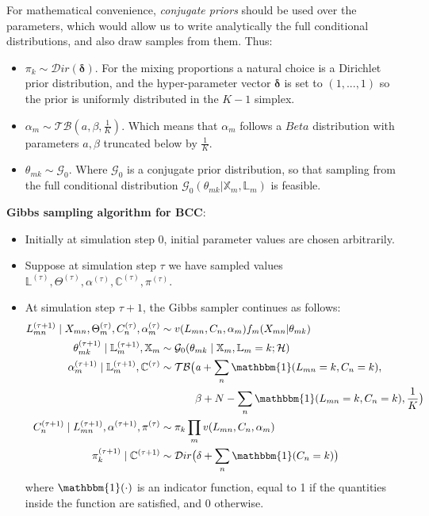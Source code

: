 For mathematical convenience, \emph{conjugate priors} should be used over the parameters, which would allow us to write analytically the full conditional distributions, and also draw samples from them. Thus:
\begin{itemize}
	\item $\pi_{k} \sim \mathcal{D}ir(\mathbf{\delta})$. For the mixing proportions a natural choice is a Dirichlet prior distribution, and the hyper-parameter vector $\mathbf{\delta}$ is set to $(1,...,1)$ so the prior is uniformly distributed in the $K-1$ simplex.
	\item $\alpha_{m} \sim \mathcal{TB}(\mathit{a}, \beta, \frac{1}{K})$. Which means that $\alpha_{m}$ follows a $Beta$ distribution with parameters $\mathit{a}, \beta$ truncated below by $\frac{1}{K}$.
	\item $\theta_{mk} \sim \mathcal{G}_{0}$. Where $\mathcal{G}_{0}$ is a conjugate prior distribution, so that sampling from the full conditional distribution $\mathcal{G}_{0}(\theta_{mk}|\mathbb{X}_{m}, \mathbb{L}_{m})$ is feasible.
\end{itemize}

\noindent\textbf{Gibbs sampling algorithm for BCC}: 
\begin{itemize}
\item {Initially at simulation step 0, initial parameter values are chosen arbitrarily.}
\item {Suppose at simulation step $\tau$ we have sampled values $\mathbb{L}^{(\tau)}, \Theta^{(\tau)}, \alpha^{(\tau)}, \mathbb{C}^{(\tau)}, \pi^{(\tau)}$.}
\item { At simulation step $\tau + 1$, the Gibbs sampler continues as follows:
\begin{equation*}%
  \begin{aligned}
    L_{mn}^{(\tau+1)} \mid X_{mn}, \Theta_{m}^{(\tau)}, C_{n}^{(\tau)}, \alpha_{m}^{(\tau)} & \sim v(L_{mn}, C_{n}, \alpha_{m}) f_{m}(X_{mn}|\theta_{mk}) \\
	\theta_{mk}^{(\tau+1)} \mid \mathbb{L}_{m}^{(\tau+1)}, \mathbb{X}_{m} & \sim \mathcal{G}_{0}(\theta_{mk} \mid \mathbb{X}_{m}, \mathbb{L}_{m} = k; \mathcal{H}) \\
	\alpha_{m}^{(\tau+1)} \mid \mathbb{L}_{m}^{(\tau+1)}, \mathbb{C}^{(\tau)} & \sim \mathcal{TB} \big(\mathit{a}+\sum_{n}\mathbbm{1}(L_{mn}=k,C_{n}=k), \\
	  & \quad \quad \quad \; \beta + N -\sum_{n}\mathbbm{1}(L_{mn}=k,C_{n}=k), \frac{1}{K}\big) \\
	C_{n}^{(\tau+1)} \mid L_{mn}^{(\tau+1)}, \alpha^{(\tau+1)}, \pi^{(\tau)} & \sim \pi_{k} \prod_{m}v(L_{mn}, C_{n}, \alpha_{m}) \\
	\pi_{k}^{(\tau+1)} \mid \mathbb{C}^{(\tau+1)} & \sim \mathcal{D}ir\big(\delta + \sum_{n}\mathbbm{1}(C_{n}=k)\big)
  \end{aligned}
\end{equation*}
where $\mathbbm{1}(\cdot)$ is an indicator function, equal to 1 if the quantities inside the function are satisfied, and 0 otherwise.
}
\end{itemize}
